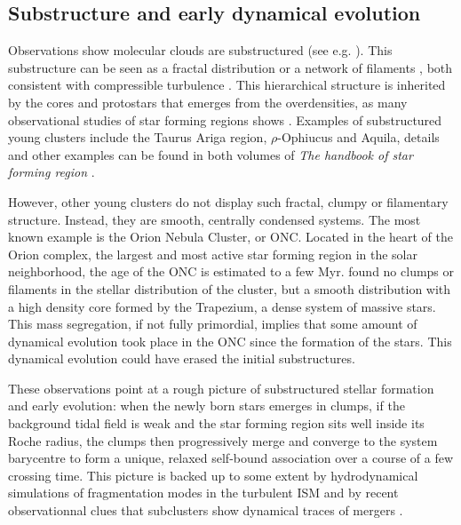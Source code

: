 \subsection{Substructure and early dynamical evolution}

Observations show molecular clouds are substructured (see e.g. \citealt{Cambresy1999}). This substructure can be seen as a fractal distribution \citep{Elmegreen1996} or a network of filaments \citep{Andre2010}, both consistent with compressible turbulence \citep{McKee2007}	. This hierarchical structure is inherited by the cores and protostars that emerges from the overdensities, as many observational studies of star forming regions shows \citep{Schneider1979,Hartmann2002,Bressert2010}. Examples of substructured young clusters include the Taurus Ariga region, $\rho$-Ophiucus and Aquila, details and other examples can be found in both volumes of \textit{The handbook of star forming region} \cite{Reipurth2008}.  

However, other young clusters do not display such fractal, clumpy or filamentary structure. Instead, they are smooth, centrally condensed systems. The most known example is the Orion Nebula Cluster, or ONC. Located in the heart of the Orion complex, the largest and most active star forming region in the solar neighborhood, the age of the ONC is estimated to a few Myr. \cite{Hillenbrand1998} found no clumps or filaments in the stellar distribution of the cluster, but a smooth distribution with a high density core formed by the Trapezium, a dense system of massive stars. This mass segregation, if not fully primordial, implies that some amount of dynamical evolution took place in the ONC since the formation of the stars. This dynamical evolution could have erased the initial substructures.

These observations point at a rough picture of substructured stellar formation and early evolution: when the newly born stars emerges in clumps, if the background tidal field is weak and the star forming region sits well inside its Roche radius, the clumps then progressively merge and converge to the system barycentre to form a unique, relaxed  self-bound association over a  course of a few crossing time. This picture is backed up to some extent by hydrodynamical simulations of fragmentation modes in the turbulent ISM \citep{Klessen2000,Bate2003,MacLow2004,Offner2009,Maschberger2010} and by recent observationnal clues that subclusters show dynamical traces of mergers \citep{Kuhn2015b}. 


